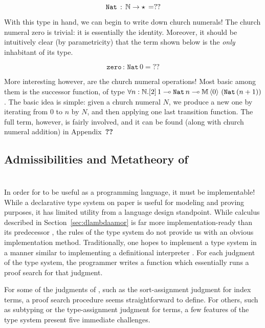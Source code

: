 $$
\texttt{Nat} \, : \, \mathbb{N} \to \star \, = ??
$$

With this type in hand, we can begin to write down church numerals! The church numeral zero is trivial: it is essentially the identity. Moreover, it should be intuitively clear (by parametricity) that the term shown below is the \textit{only} inhabitant of its type.

$$
\texttt{zero} \, : \, \texttt{Nat} \, 0 = ??
$$

More interesting however, are the church numeral operations! Most basic among them is the successor function, of type $\forall n : \mathbb{N}. [2] \, 1 \multimap \texttt{Nat} \, n \multimap \mathbb{M} \, \langle 0 \rangle \, \left(\texttt{Nat} \, (n+1)\right)$. The basic idea is simple: given a church numeral $N$, we produce a new one by iterating from $0$
to $n$ by $N$, and then applying one last transition function. The full term, however, is fairly involved, and it can be found (along with church numeral addition) in Appendix~\textbf{??}

\subsection{Admissibilities and Metatheory of \dlambdaamor}

\section{\bilambdaamor}
\label{sec:bilambdaamor}
In order for \dlambdaamor to be useful as a programming language, it must be implementable! While a declarative type system on paper is useful for modeling and proving purposes, it has limited utility from a language design standpoint. While \dlambdaamor calculus described in Section~\ref{sec:dlambdaamor} is far more implementation-ready than its predecessor \lambdaamorminus, the rules of the type system do not provide us with an obvious implementation method. Traditionally, one hopes to implement a type system in a manner similar to implementing a definitional interpreter . For each judgment of the type system, the programmer writes a function which essentially runs a proof search for that judgment.

For some of the judgments of \dlambdaamor, such as the sort-assignment judgment for index terms, a proof search procedure seems straightforward to define. For others, such as subtyping or the type-assignment judgment for terms, a few features of the type system present five immediate challenges.

